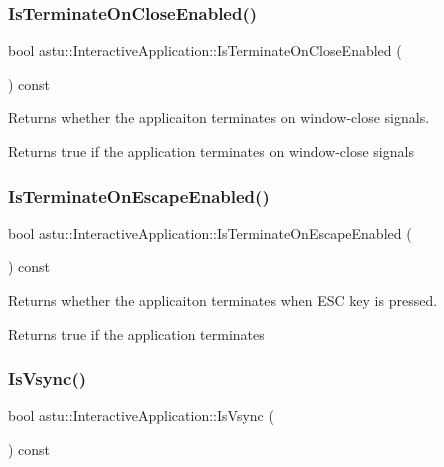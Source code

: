 \subsubsection{\texorpdfstring{Is\+Terminate\+On\+Close\+Enabled()}{IsTerminateOnCloseEnabled()}}
{\footnotesize\ttfamily bool astu\+::\+Interactive\+Application\+::\+Is\+Terminate\+On\+Close\+Enabled (\begin{DoxyParamCaption}{ }\end{DoxyParamCaption}) const}

Returns whether the applicaiton terminates on window-\/close signals.

\begin{DoxyReturn}{Returns}
{\ttfamily true} if the application terminates on window-\/close signals 
\end{DoxyReturn}
\mbox{\label{classastu_1_1InteractiveApplication_aba7a0ca8c2becfb7b90a5fb7c8842226}} 
\subsubsection{\texorpdfstring{Is\+Terminate\+On\+Escape\+Enabled()}{IsTerminateOnEscapeEnabled()}}
{\footnotesize\ttfamily bool astu\+::\+Interactive\+Application\+::\+Is\+Terminate\+On\+Escape\+Enabled (\begin{DoxyParamCaption}{ }\end{DoxyParamCaption}) const}

Returns whether the applicaiton terminates when E\+SC key is pressed.

\begin{DoxyReturn}{Returns}
{\ttfamily true} if the application terminates 
\end{DoxyReturn}
\mbox{\label{classastu_1_1InteractiveApplication_afd105e1fc78f2f7e61da9b3e7a13fce0}} 
\subsubsection{\texorpdfstring{Is\+Vsync()}{IsVsync()}}
{\footnotesize\ttfamily bool astu\+::\+Interactive\+Application\+::\+Is\+Vsync (\begin{DoxyParamCaption}{ }\end{DoxyParamCaption}) const}

